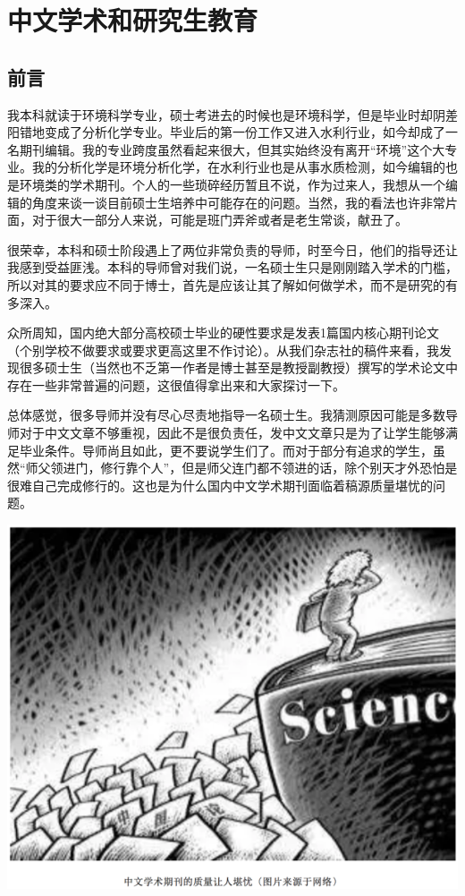 \documentclass[]{book}
\begin{document}
\section{中文学术和研究生教育}

\subsection{前言}\label{-5}

我本科就读于环境科学专业，硕士考进去的时候也是环境科学，但是毕业时却阴差阳错地变成了分析化学专业。毕业后的第一份工作又进入水利行业，如今却成了一名期刊编辑。我的专业跨度虽然看起来很大，但其实始终没有离开``环境''这个大专业。我的分析化学是环境分析化学，在水利行业也是从事水质检测，如今编辑的也是环境类的学术期刊。个人的一些琐碎经历暂且不说，作为过来人，我想从一个编辑的角度来谈一谈目前硕士生培养中可能存在的问题。当然，我的看法也许非常片面，对于很大一部分人来说，可能是班门弄斧或者是老生常谈，献丑了。

很荣幸，本科和硕士阶段遇上了两位非常负责的导师，时至今日，他们的指导还让我感到受益匪浅。本科的导师曾对我们说，一名硕士生只是刚刚踏入学术的门槛，所以对其的要求应不同于博士，首先是应该让其了解如何做学术，而不是研究的有多深入。

众所周知，国内绝大部分高校硕士毕业的硬性要求是发表1篇国内核心期刊论文（个别学校不做要求或要求更高这里不作讨论）。从我们杂志社的稿件来看，我发现很多硕士生（当然也不乏第一作者是博士甚至是教授副教授）撰写的学术论文中存在一些非常普遍的问题，这很值得拿出来和大家探讨一下。

总体感觉，很多导师并没有尽心尽责地指导一名硕士生。我猜测原因可能是多数导师对于中文文章不够重视，因此不是很负责任，发中文文章只是为了让学生能够满足毕业条件。导师尚且如此，更不要说学生们了。而对于部分有追求的学生，虽然``师父领进门，修行靠个人''，但是师父连门都不领进的话，除个别天才外恐怕是很难自己完成修行的。这也是为什么国内中文学术期刊面临着稿源质量堪忧的问题。

\includegraphics[width=8.33in]{images/edit1}
\end{document}
